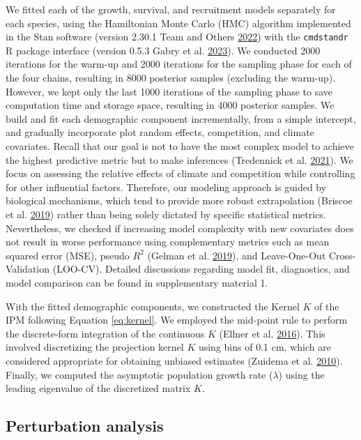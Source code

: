 \documentclass[12pt]{article}
\begin{document}
We fitted each of the growth, survival, and recruitment models
separately for each species, using the Hamiltonian Monte Carlo (HMC)
algorithm implemented in the Stan software (version 2.30.1 Team and
Others \protect\hyperlink{ref-stan2022stan}{2022}) with the
\texttt{cmdstandr} R package interface (version 0.5.3 Gabry et al.
\protect\hyperlink{ref-cmdstanr}{2023}). We conducted 2000 iterations
for the warm-up and 2000 iterations for the sampling phase for each of
the four chains, resulting in 8000 posterior samples (excluding the
warm-up). However, we kept only the last 1000 iterations of the sampling
phase to save computation time and storage space, resulting in 4000
posterior samples. We build and fit each demographic component
incrementally, from a simple intercept, and gradually incorporate plot
random effects, competition, and climate covariates. Recall that our
goal is not to have the most complex model to achieve the highest
predictive metric but to make inferences (Tredennick et al.
\protect\hyperlink{ref-Tredennick2021}{2021}). We focus on assessing the
relative effects of climate and competition while controlling for other
influential factors. Therefore, our modeling approach is guided by
biological mechanisms, which tend to provide more robust extrapolation
(Briscoe et al. \protect\hyperlink{ref-Briscoe2019}{2019}) rather than
being solely dictated by specific statistical metrics. Nevertheless, we
checked if increasing model complexity with new covariates does not
result in worse performance using complementary metrics such as mean
squared error (MSE), pseudo \(R^2\) (Gelman et al.
\protect\hyperlink{ref-Gelman2019}{2019}), and Leave-One-Out
Cross-Validation (LOO-CV). Detailed discussions regarding model fit,
diagnostics, and model comparison can be found in supplementary material
1.

With the fitted demographic components, we constructed the Kernel \(K\)
of the IPM following Equation \ref{eq:kernel}. We employed the mid-point
rule to perform the discrete-form integration of the continuous \(K\)
(Ellner et al. \protect\hyperlink{ref-Ellner2016}{2016}). This involved
discretizing the projection kernel \(K\) using bins of 0.1 cm, which are
considered appropriate for obtaining unbiased estimates (Zuidema et al.
\protect\hyperlink{ref-zuidema2010integral}{2010}). Finally, we computed
the asymptotic population growth rate (\(\lambda\)) using the leading
eigenvalue of the discretized matrix \(K\).

\hypertarget{perturbation-analysis}{%
\subsection{Perturbation analysis}\label{perturbation-analysis}}
\end{document}
